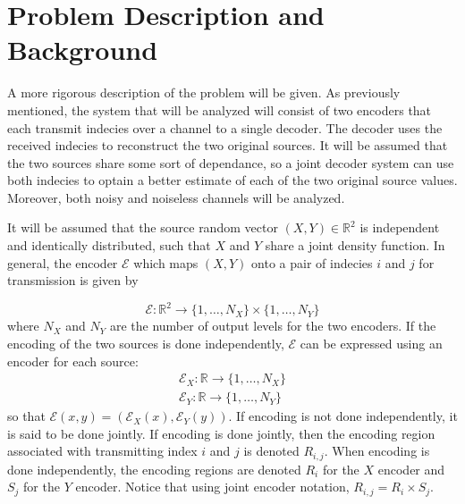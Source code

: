 \documentclass[10pt]{article}
\newcommand{\real}{\mathbb{R}}
\begin{document}
\section{Problem Description and Background}

A more rigorous description of the problem will be given. As previously mentioned, the system that will be analyzed will consist of two encoders that each transmit indecies over a channel to a single decoder. The decoder uses the received indecies to reconstruct the two original sources. It will be assumed that the two sources share some sort of dependance, so a joint decoder system can use both indecies to optain a better estimate of each of the two original source values. Moreover, both noisy and noiseless channels will be analyzed.

It will be assumed that the source random vector $(X,Y)\in\real^2$ is independent and identically distributed, such that $X$ and $Y$ share a joint density function. In general, the encoder $\mathcal{E}$ which maps $(X,Y)$ onto a pair of indecies $i$ and $j$ for transmission is given by

\begin{equation*}
    \mathcal{E} : \real^2\to\{1,\ldots,N_X\} \times \{1,\ldots,N_Y\}
\end{equation*}
where $N_X$ and $N_Y$ are the number of output levels for the two encoders. If the encoding of the two sources is done independently, $\mathcal{E}$ can be expressed using an encoder for each source:
\begin{gather*}
    \mathcal{E}_X : \real\to\{1,\ldots,N_X\} \\
    \mathcal{E}_Y : \real\to\{1,\ldots,N_Y\}
\end{gather*}
so that $\mathcal{E}(x,y) = (\mathcal{E}_X(x), \mathcal{E}_Y(y))$. If encoding is not done independently, it is said to be done jointly. If encoding is done jointly, then the encoding region associated with transmitting index $i$ and $j$ is denoted $R_{i,j}$. When encoding is done independently, the encoding regions are denoted $R_i$ for the $X$ encoder and $S_j$ for the $Y$ encoder. Notice that using joint encoder notation, $R_{i,j} = R_i \times S_j$.
\end{document}
